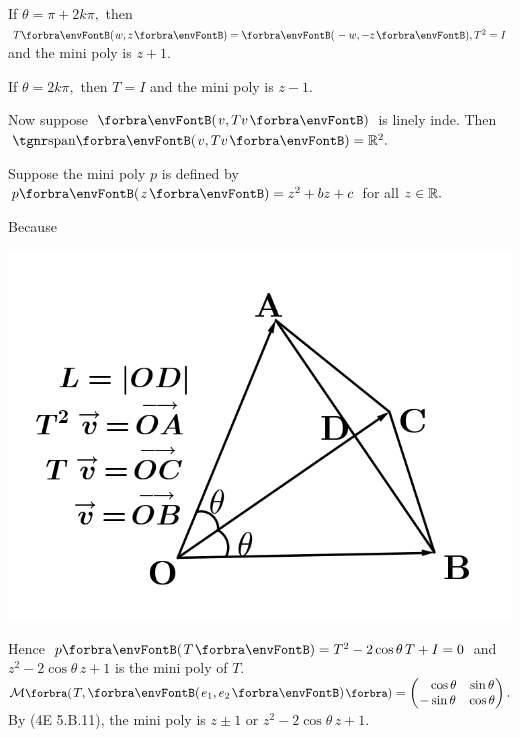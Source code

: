 \documentclass[a4paper, 11pt, UTF8]{article}
\begin{document}
\begin{large}
\par\quad
If $\theta=\pi+2k\pi,$ then $T\Par{w,z}=\Par{-w,-z},T^2=I$ and the mini poly is $z+1.$\par\quad
If $\theta=2k\pi,$ then $T=I$ and the mini poly is $z-1.$\par\quad
Now suppose $\Par{v,Tv}$ is linely inde. Then $\Span{v,Tv}=\Rbb^2.$\par\quad
Suppose the mini poly $p$ is defined by $p\Par{z}=z^2+bz+c$ for all $z\in{\mathbb{R}}.$\par\vspace{12pt}\quad
Because\vspace{-28pt}\par\quad
\hspace{45pt}\includegraphics[scale=0.22]{./diagram.png}\par\vspace{-70pt}\quad
{}\par\vspace{8pt}\quad
Hence $p\Par{T}=T^2-2\cos\theta\, T+I=0$ and $z^2-2\cos\theta\, z+1$ is the mini poly of $T.$\PfEnd\vspace{3pt}\quad
\Or $\Mt[\BigPar]{T,\Par{e_1,e_2}}=
\begin{pmatrix}
	\Blind{-}\cos\theta & \sin\theta\\
	-\sin\theta & \cos\theta
\end{pmatrix}.$ By (4E 5.B.11), the mini poly is $z\pm 1$ or $z^2-2\cos\theta\,z+1.$\PfEnd
\SepLine


\end{large}
\end{document}
